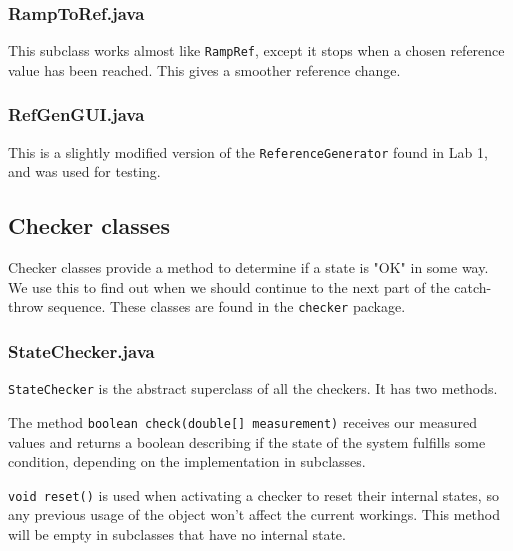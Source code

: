 \subsubsection{RampToRef.java}
This subclass works almost like \texttt{RampRef}, except it stops when a chosen reference value has been reached. This gives a smoother reference change.

\subsubsection{RefGenGUI.java}
This is a slightly modified version of the \texttt{ReferenceGenerator} found in Lab 1, and was used for testing.








\subsection{Checker classes}\label{Checkers}
Checker classes provide a method to determine if a state is "OK" in some way. We use this to find out when we should continue to the next part of the catch-throw sequence. These classes are found in the \texttt{checker} package.
\subsubsection{StateChecker.java}
\texttt{StateChecker} is the abstract superclass of all the checkers. It has two methods.

The method \texttt{boolean check(double[] measurement)} receives our measured values and returns a boolean describing if the state of the system fulfills some condition, depending on the implementation in subclasses.

\texttt{void reset()} is used when activating a checker to reset their internal states, so any previous usage of the object won't  affect the current workings. This method will be empty in subclasses that have no internal state.


